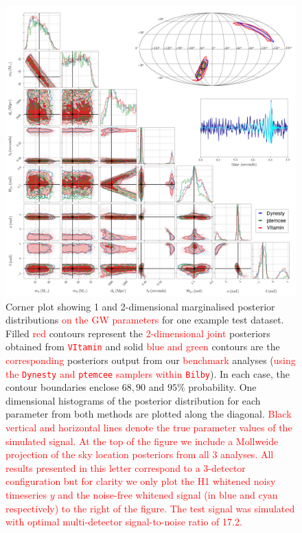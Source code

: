 \documentclass[%
showpacs,
nofootinbib,
 amsmath,amssymb,
 aps,
 twocolumn,
 prl,
 reprint,
floatfix,
]{revtex4-1}
\newcommand{\new}[1]{\textcolor{red}{#1}}
\begin{document}
%
%
\begin{figure}
    \includegraphics[width=\textwidth]{corner_testcase0.png}
    \caption{\label{fig:corner_plot} Corner plot showing 1 and 2-dimensional
marginalised posterior distributions \new{on the \ac{GW} parameters} for one
example test dataset. Filled \new{red} contours represent the
\new{2-dimensional joint} posteriors obtained from \new{\texttt{VItamin}} and
solid \new{blue and green} contours are the \new{corresponding} posteriors
output from our \new{benchmark} analyses (\new{using the \texttt{Dynesty} and \texttt{ptemcee}
samplers within \texttt{Bilby}}). In each case, the contour boundaries enclose
$68,90$ and $95\%$ probability. One dimensional histograms of the posterior
distribution for each parameter from both methods are plotted along the
diagonal. \new{Black vertical and horizontal lines denote the true parameter
values of the simulated signal. At the top of the figure we include a Mollweide
projection of the sky location posteriors from all 3 analyses. All results
presented in this letter correspond to a 3-detector configuration but for
clarity we only plot the H1 whitened noisy timeseries $y$ and the noise-free
whitened signal (in blue and cyan respectively) to the right of the figure. The
test signal was simulated with optimal multi-detector signal-to-noise ratio of
17.2.}} 
\end{figure}
\end{document}
